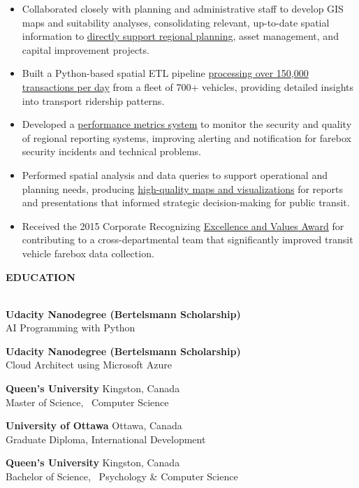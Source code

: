 \documentclass[letterpaper]{article}
\newcommand{\lineunder} {
        \vspace*{-8pt} \\
        \hspace*{-18pt} \hrulefill \\
    }
\newcommand{\header} [1] {
        \vspace{9pt}
        {\hspace*{-18pt}\vspace*{6pt} \large \textbf {#1}}
        \vspace*{-6pt} \lineunder
        \vspace{2pt}
    }
\newenvironment{jobtasklist}
        {
            \vspace{-12pt}
            \begin{itemize} \itemsep 0pt
        }{
            \end{itemize}
            \vspace{-3pt}
        }
\newcommand{\university}[3]{
        \textbf{#1}  %
        \hfill #2\\  %
        #3\\         %
        \vspace{2mm}
    }
\newcommand{\impt}[1]{\uline{#1}}
\begin{document}
\begin{jobtasklist}
    \item Collaborated closely with planning and administrative staff to develop GIS maps and suitability analyses,
        consolidating relevant, up-to-date spatial information to \impt{directly support regional planning}, asset
            management, and capital improvement projects.
    \item Built a Python-based spatial ETL pipeline
            \impt{processing over 150,000 transactions per day}
            from a fleet of 700+ vehicles, providing detailed insights into transport ridership patterns.
    \item Developed a \impt{performance metrics system} to monitor the security and
            quality of regional reporting systems, improving alerting and
            notification for farebox security incidents and technical problems.
    \item Performed spatial analysis and data queries to support operational
            and planning needs, producing \impt{high-quality maps and visualizations} for
            reports and presentations that informed strategic decision-making for
            public transit.
    \item Received the 2015 Corporate Recognizing \impt{Excellence and Values Award}
            for contributing to a cross-departmental team that significantly
            improved transit vehicle farebox data collection.
\end{jobtasklist}



\header{EDUCATION}
    \university
        {Udacity Nanodegree (Bertelsmann Scholarship)}
        {}
        {AI Programming with Python}
    \university
        {Udacity Nanodegree (Bertelsmann Scholarship)}
        {}
        {Cloud Architect using Microsoft Azure}
    \university
        {Queen's University}
        {Kingston, Canada}
        {Master of Science, ~Computer Science}

    \university
        {University of Ottawa}
        {Ottawa, Canada}
        {Graduate Diploma, International Development}

    \university
        {Queen's University}
        {Kingston, Canada}
        {Bachelor of Science, ~Psychology \& Computer Science}
\end{document}
